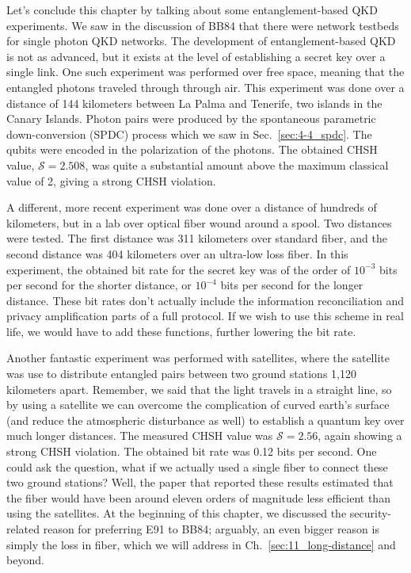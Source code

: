 Let's conclude this chapter by talking about some entanglement-based QKD experiments.
We saw in the discussion of BB84 that there were network testbeds for single photon QKD networks.
The development of entanglement-based QKD is not as advanced, but it exists at the level of establishing a secret key over a single link.
One such experiment was performed over free space, meaning that the entangled photons traveled through through air.
This experiment was done over a distance of 144 kilometers between La Palma and Tenerife, two islands in the Canary Islands.
Photon pairs were produced by the spontaneous parametric down-conversion (SPDC) process which we saw in Sec.~\ref{sec:4-4_spdc}.
The qubits were encoded in the polarization of the photons.
The obtained CHSH value, $\mathcal{S} =2.508$, was quite a substantial amount above the maximum classical value of 2, giving a strong CHSH violation.

A different, more recent experiment was done over a distance of hundreds of kilometers, but in a lab over optical fiber wound around a spool.  Two distances were tested.
The first distance was 311 kilometers over standard fiber, and the second distance was 404 kilometers over an ultra-low loss fiber.
In this experiment, the obtained bit rate for the secret key was of the order of $10^{-3}$ bits per second for the shorter distance, or $10^{-4}$ bits per second for the longer distance. These bit rates don't actually include the information reconciliation and privacy amplification parts of a full protocol.
If we wish to use this scheme in real life, we would have to add these functions, further lowering the bit rate.

Another fantastic experiment was performed with satellites, where the satellite was use to distribute entangled pairs between two ground stations 1,120 kilometers apart.
Remember, we said that the light travels in a straight line, so by using a satellite we can overcome the complication of curved earth's surface (and reduce the atmospheric disturbance as well) to establish a quantum key over much longer distances.
The measured CHSH value was $\mathcal{S} = 2.56$, again showing a strong CHSH violation.
The obtained bit rate was 0.12 bits per second.
One could ask the question, what if we actually used a single fiber to connect these two ground stations?
Well, the paper that reported these results estimated that the fiber would have been around eleven orders of magnitude less efficient than using the satellites.
At the beginning of this chapter, we discussed the security-related reason for preferring E91 to BB84; arguably, an even bigger reason is simply the loss in fiber, which we will address in Ch.~\ref{sec:11_long-distance} and beyond.

